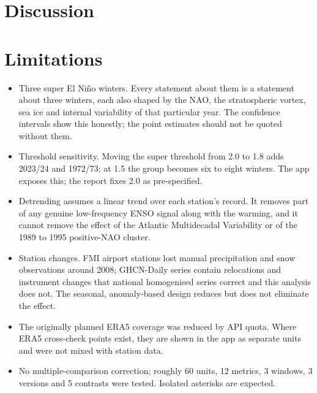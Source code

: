 \documentclass[11pt,a4paper]{article}
\begin{document}
\begin{table}[H]
\caption{DJF detrended anomalies: differences of group means with 95\,\% confidence intervals (bootstrap; Welch $t$-interval when a group has $n<6$) and permutation $p$ ($^{*}$: $p<0.05$, uncorrected).}
\label{tab:contr}
\scriptsize

\end{table}

\begin{table}[H]
\caption{As Table~\ref{tab:contr} for January to March.}
\label{tab:contrjfm}
\scriptsize

\end{table}

\section{Discussion}


\section{Limitations}
\begin{itemize}
\item Three super El Niño winters. Every statement about them is a statement about three winters, each also shaped by the NAO, the stratospheric vortex, sea ice and internal variability of that particular year. The confidence intervals show this honestly; the point estimates should not be quoted without them.
\item Threshold sensitivity. Moving the super threshold from 2.0 to 1.8 adds 2023/24 and 1972/73; at 1.5 the group becomes six to eight winters. The app exposes this; the report fixes 2.0 as pre-specified.
\item Detrending assumes a linear trend over each station's record. It removes part of any genuine low-frequency ENSO signal along with the warming, and it cannot remove the effect of the Atlantic Multidecadal Variability or of the 1989 to 1995 positive-NAO cluster.
\item Station changes. FMI airport stations lost manual precipitation and snow observations around 2008; GHCN-Daily series contain relocations and instrument changes that national homogenised series correct and this analysis does not. The seasonal, anomaly-based design reduces but does not eliminate the effect.
\item The originally planned ERA5 coverage was reduced by API quota. Where ERA5 cross-check points exist, they are shown in the app as separate units and were not mixed with station data.
\item No multiple-comparison correction; roughly 60 units, 12 metrics, 3 windows, 3 versions and 5 contrasts were tested. Isolated asterisks are expected.
\end{itemize}
\end{document}
